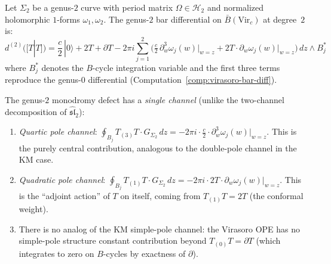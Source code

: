 \begin{theorem}\label{thm:virasoro-genus2-bar}
Let $\Sigma_2$ be a genus-$2$ curve with period matrix
$\Omega \in \mathcal{H}_2$ and normalized holomorphic
$1$-forms $\omega_1, \omega_2$.  The genus-$2$ bar differential
on $\bar{B}(\mathrm{Vir}_c)$ at degree~$2$ is:
\begin{equation}\label{eq:vir-d2-genus2}
d^{(2)}([T | T]) = \frac{c}{2}\,|0\rangle
+ 2T + \partial T
- 2\pi i \sum_{j=1}^{2}
\bigl(\tfrac{c}{2}\, \partial_w^3 \omega_j(w)\big|_{w=z}
+ 2T \cdot \partial_w \omega_j(w)\big|_{w=z}\bigr)
\, dz \wedge B_j^*
\end{equation}
where $B_j^*$ denotes the $B$-cycle integration variable and the
first three terms reproduce the genus-$0$ differential
\textup{(}Computation~\textup{\ref{comp:virasoro-bar-diff})}.

The genus-$2$ monodromy defect has a \emph{single channel}
\textup{(}unlike the two-channel decomposition of
$\widehat{\mathfrak{sl}}_2$\textup{)}:
\begin{enumerate}[label=\textup{(\roman*)}]
\item \emph{Quartic pole channel}:
  $\oint_{B_j} T_{(3)} T \cdot G_{\Sigma_2} \,dz
  = -2\pi i \cdot \frac{c}{2} \cdot
  \partial_w^3 \omega_j(w)\big|_{w=z}$.
  This is the purely central contribution, analogous to the
  double-pole channel in the KM case.
\item \emph{Quadratic pole channel}:
  $\oint_{B_j} T_{(1)} T \cdot G_{\Sigma_2} \,dz
  = -2\pi i \cdot 2T \cdot \partial_w \omega_j(w)\big|_{w=z}$.
  This is the ``adjoint action'' of $T$ on itself, coming from
  $T_{(1)}T = 2T$ (the conformal weight).
\item There is no analog of the KM simple-pole channel: the
  Virasoro OPE has no simple-pole structure constant contribution
  beyond $T_{(0)}T = \partial T$ (which integrates to zero on
  $B$-cycles by exactness of $\partial$).
\end{enumerate}
\end{theorem}

